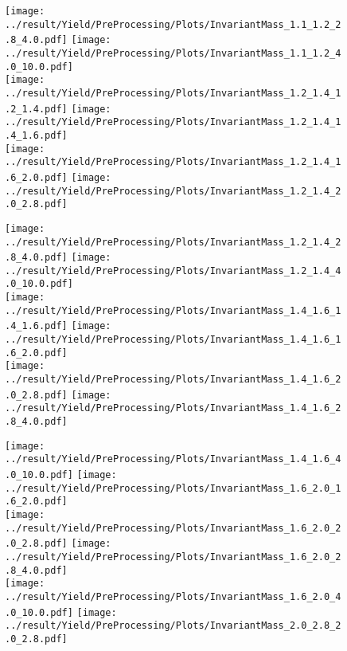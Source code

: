 \begin{figure}[!h]
	\centering
		\texttt{[image: ../result/Yield/PreProcessing/Plots/InvariantMass\_1.1\_1.2\_2.8\_4.0.pdf]}
		\texttt{[image: ../result/Yield/PreProcessing/Plots/InvariantMass\_1.1\_1.2\_4.0\_10.0.pdf]}\\
		\texttt{[image: ../result/Yield/PreProcessing/Plots/InvariantMass\_1.2\_1.4\_1.2\_1.4.pdf]}
		\texttt{[image: ../result/Yield/PreProcessing/Plots/InvariantMass\_1.2\_1.4\_1.4\_1.6.pdf]}	\\
		\texttt{[image: ../result/Yield/PreProcessing/Plots/InvariantMass\_1.2\_1.4\_1.6\_2.0.pdf]}
		\texttt{[image: ../result/Yield/PreProcessing/Plots/InvariantMass\_1.2\_1.4\_2.0\_2.8.pdf]}

\end{figure}

\begin{figure}[!h]
	\centering
		\texttt{[image: ../result/Yield/PreProcessing/Plots/InvariantMass\_1.2\_1.4\_2.8\_4.0.pdf]}
		\texttt{[image: ../result/Yield/PreProcessing/Plots/InvariantMass\_1.2\_1.4\_4.0\_10.0.pdf]}\\
		\texttt{[image: ../result/Yield/PreProcessing/Plots/InvariantMass\_1.4\_1.6\_1.4\_1.6.pdf]}
		\texttt{[image: ../result/Yield/PreProcessing/Plots/InvariantMass\_1.4\_1.6\_1.6\_2.0.pdf]}\\
		\texttt{[image: ../result/Yield/PreProcessing/Plots/InvariantMass\_1.4\_1.6\_2.0\_2.8.pdf]}
		\texttt{[image: ../result/Yield/PreProcessing/Plots/InvariantMass\_1.4\_1.6\_2.8\_4.0.pdf]}
\end{figure}

\begin{figure}[!h]
	\centering
		\texttt{[image: ../result/Yield/PreProcessing/Plots/InvariantMass\_1.4\_1.6\_4.0\_10.0.pdf]}
		\texttt{[image: ../result/Yield/PreProcessing/Plots/InvariantMass\_1.6\_2.0\_1.6\_2.0.pdf]}\\
		\texttt{[image: ../result/Yield/PreProcessing/Plots/InvariantMass\_1.6\_2.0\_2.0\_2.8.pdf]}
		\texttt{[image: ../result/Yield/PreProcessing/Plots/InvariantMass\_1.6\_2.0\_2.8\_4.0.pdf]}\\
		\texttt{[image: ../result/Yield/PreProcessing/Plots/InvariantMass\_1.6\_2.0\_4.0\_10.0.pdf]}
		\texttt{[image: ../result/Yield/PreProcessing/Plots/InvariantMass\_2.0\_2.8\_2.0\_2.8.pdf]}

\end{figure}


